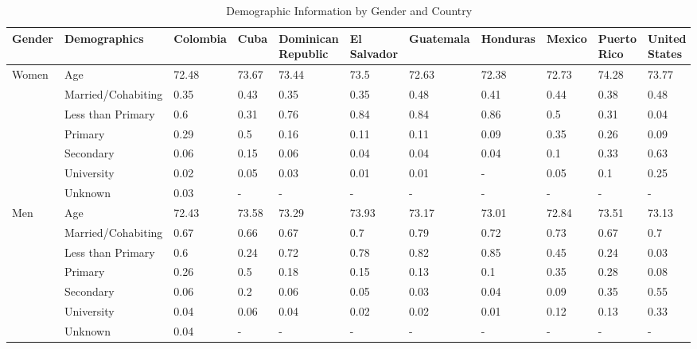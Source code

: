 \documentclass[
]{article}
\begin{document}
\begin{landscape}

\begin{table}[ht]
\centering
\caption{Demographic Information by Gender and Country}
\begingroup\small
\begin{tabular}{l|l|lllllllll}
  \hline
Gender & Demographics & Colombia & Cuba & Dominican Republic & El Salvador & Guatemala & Honduras & Mexico & Puerto Rico & United States \\ 
  \hline
Women & Age & 72.48 & 73.67 & 73.44 & 73.5 & 72.63 & 72.38 & 72.73 & 74.28 & 73.77 \\ 
   & Married/Cohabiting & 0.35 & 0.43 & 0.35 & 0.35 & 0.48 & 0.41 & 0.44 & 0.38 & 0.48 \\ 
   & Less than Primary & 0.6 & 0.31 & 0.76 & 0.84 & 0.84 & 0.86 & 0.5 & 0.31 & 0.04 \\ 
   & Primary & 0.29 & 0.5 & 0.16 & 0.11 & 0.11 & 0.09 & 0.35 & 0.26 & 0.09 \\ 
   & Secondary & 0.06 & 0.15 & 0.06 & 0.04 & 0.04 & 0.04 & 0.1 & 0.33 & 0.63 \\ 
   & University & 0.02 & 0.05 & 0.03 & 0.01 & 0.01 & - & 0.05 & 0.1 & 0.25 \\ 
   & Unknown & 0.03 & - & - & - & - & - & - & - & - \\ 
Men & Age & 72.43 & 73.58 & 73.29 & 73.93 & 73.17 & 73.01 & 72.84 & 73.51 & 73.13 \\ 
   & Married/Cohabiting & 0.67 & 0.66 & 0.67 & 0.7 & 0.79 & 0.72 & 0.73 & 0.67 & 0.7 \\ 
   & Less than Primary & 0.6 & 0.24 & 0.72 & 0.78 & 0.82 & 0.85 & 0.45 & 0.24 & 0.03 \\ 
   & Primary & 0.26 & 0.5 & 0.18 & 0.15 & 0.13 & 0.1 & 0.35 & 0.28 & 0.08 \\ 
   & Secondary & 0.06 & 0.2 & 0.06 & 0.05 & 0.03 & 0.04 & 0.09 & 0.35 & 0.55 \\ 
   & University & 0.04 & 0.06 & 0.04 & 0.02 & 0.02 & 0.01 & 0.12 & 0.13 & 0.33 \\ 
   & Unknown & 0.04 & - & - & - & - & - & - & - & - \\ 
\hline
\end{tabular}
\endgroup
\end{table}

\newpage


\end{landscape}
\end{document}
